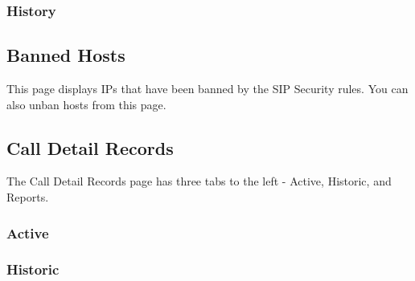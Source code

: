 \documentclass[letterpaper,10pt,english]{sphinxmanual}
\begin{document}
\subsubsection{History}
\label{\detokenize{webui:history}}\begin{quote}

\end{quote}


\subsection{Banned Hosts}
\label{\detokenize{webui:banned-hosts}}\label{\detokenize{webui:diagnostics-banned-hosts}}
This page displays IPs that have been banned by the SIP Security rules. You can also unban hosts from this page.
\begin{quote}

\end{quote}


\subsection{Call Detail Records}
\label{\detokenize{webui:call-detail-records}}\label{\detokenize{webui:diagnostics-call-detail-records}}
The Call Detail Records page has three tabs to the left - Active, Historic, and Reports.


\subsubsection{Active}
\label{\detokenize{webui:active}}\begin{quote}

\end{quote}


\subsubsection{Historic}
\label{\detokenize{webui:historic}}\begin{quote}

\end{quote}
\end{document}
